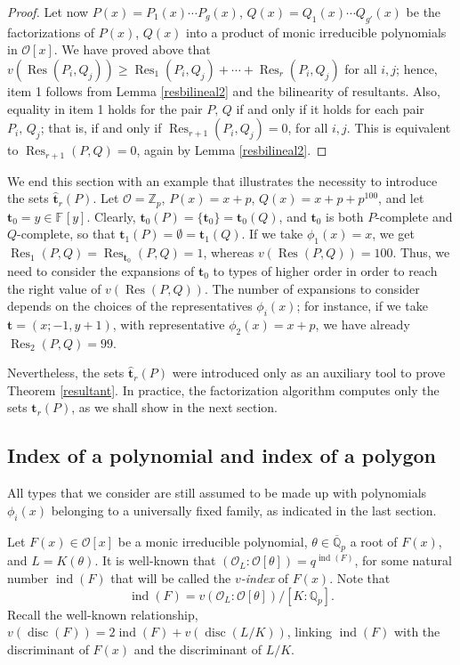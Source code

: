\documentclass{amsart}
\newcommand{\Z}{\mathbb Z}
\newcommand{\Q}{\mathbb Q}
\def\op{\operatorname}
\def\dsc{\op{disc}}
\def\ff#1{\mathbb{F}_{#1}}
\def\ind{\op{ind}}
\def\ol{{\mathcal O}_L}
\def\oo{{\mathcal O}}
\def\qpb{\overline{\mathbb{Q}}_p}
\def\res{\op{Res}}
\def\t{\theta}
\def\tt{\hat{\mathbf{t}}}
\def\ty{\mathbf{t}}
\def\zpx{\oo[x]}
\begin{document}
\begin{proof}
Let now $P(x)=P_1(x)\cdots P_g(x)$, $Q(x)=Q_1(x)\cdots Q_{g'}(x)$ be the  factorizations of $P(x)$, $Q(x)$ into a product of monic irreducible polynomials in $\zpx$. We have proved above that $v(\res(P_i,Q_j))\ge \res_1(P_i,Q_j)+\cdots+\res_r(P_i,Q_j)$ for all $i,j$; hence, item 1 follows from Lemma \ref{resbilineal2} and the bilinearity of resultants. Also, equality in item 1 holds for the pair $P,\,Q$ if and only if it holds for each pair $P_i,\,Q_j$; that is, if and only if $\res_{r+1}(P_i,Q_j)=0$, for all $i,j$. This is equivalent to $\res_{r+1}(P,Q)=0$, again by Lemma \ref{resbilineal2}. 
\end{proof}

We end this section with an example that illustrates the necessity to introduce the sets $\tt_r(P)$. Let $\oo=\Z_p$, $P(x)=x+p$, $Q(x)=x+p+p^{100}$, and let $\ty_0=y\in\ff{}[y]$. Clearly, $\ty_0(P)=\{\ty_0\}=\ty_0(Q)$, and $\ty_0$ is both $P$-complete and $Q$-complete, so that $\ty_1(P)=\emptyset=\ty_1(Q)$. If we take $\phi_1(x)=x$, we get $\res_1(P,Q)=\res_{\ty_0}(P,Q)=1$, whereas $v(\res(P,Q))=100$. Thus, we need to consider the expansions of $\ty_0$ to types of higher order in order to reach the right value of $v(\res(P,Q))$. The number of expansions to consider depends on the choices of the representatives $\phi_i(x)$; for instance, if we take $\ty=(x;-1,y+1)$, with representative $\phi_2(x)=x+p$, we have already $\res_2(P,Q)=99$.   
 
Nevertheless, the sets $\tt_r(P)$ were introduced only as an auxiliary tool to prove Theorem \ref{resultant}. In practice, the factorization algorithm computes only the sets $\ty_r(P)$, as we shall show in the next section.
 
\subsection{Index of a polynomial and index of a polygon}
All types that we consider are still assumed to be made up with  polynomials $\phi_i(x)$ belonging to a universally fixed family, as  indicated in the last section.
  
Let $F(x)\in\zpx$ be a monic irreducible polynomial, $\t\in\qpb$ a root of $F(x)$, and $L=K(\t)$. It is well-known that $(\ol\colon\oo[\t])=q^{\ind(F)}$, for some natural number $\ind(F)$ that will be called the 
 \emph{$v$-index} of $F(x)$. Note that
$$\ind(F)=v(\ol\colon\oo[\t])/[K\colon\Q_p].$$ Recall the well-known relationship,
$v(\dsc(F))=2\ind(F)+v(\dsc(L/K))$, linking $\ind(F)$ with the discriminant of $F(x)$ and the discriminant of $L/K$. 
\end{document}
